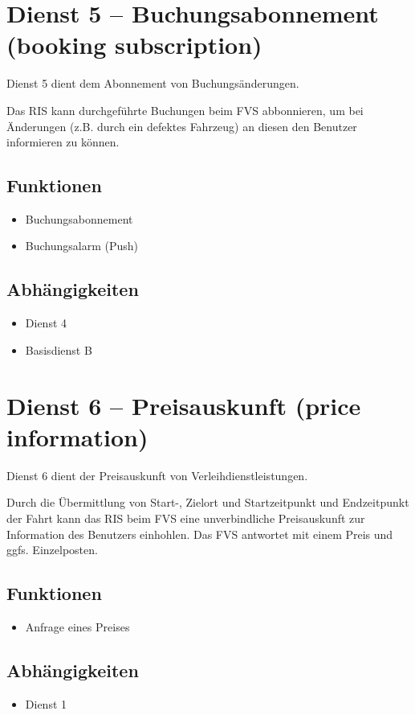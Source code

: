 \section{Dienst 5 -- Buchungsabonnement (booking subscription)}
Dienst 5 dient dem Abonnement von Buchungsänderungen.

Das RIS kann durchgeführte Buchungen beim FVS abbonnieren, um bei Änderungen (z.B. durch ein defektes Fahrzeug) an diesen den Benutzer informieren zu können.
\subsection*{Funktionen}
\begin{itemize}
\item Buchungsabonnement
\item Buchungsalarm (Push)
\end{itemize}

\subsection*{Abhängigkeiten}
\begin{itemize}
\item Dienst 4
\item Basisdienst B
\end{itemize}

\section{Dienst 6 -- Preisauskunft (price information)}
Dienst 6 dient der Preisauskunft von Verleihdienstleistungen. 

Durch die Übermittlung von Start-, Zielort und Startzeitpunkt und Endzeitpunkt der Fahrt kann das RIS beim FVS eine unverbindliche Preisauskunft zur Information des Benutzers einhohlen. Das FVS antwortet mit einem Preis und ggfs. Einzelposten.

\subsection*{Funktionen}
\begin{itemize}
\item Anfrage eines Preises
\end{itemize}

\subsection*{Abhängigkeiten}
\begin{itemize}
\item Dienst 1
\end{itemize}


